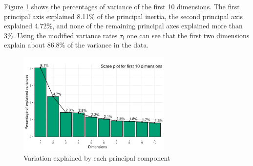 \documentclass[conference,final,]{IEEEtran}
\begin{document}
Figure \ref{fig:screeplot} shows the percentages of variance of the
first 10 dimensions. The first principal axis explained 8.11\% of the
principal inertia, the second principal axis explained 4.72\%, and none
of the remaining principal axes explained more than 3\%. Using the
modified variance rates \(\tau_l\) one can see that the first two
dimensions explain about 86.8\% of the variance in the data.

\begin{figure}[!ht] 
\centering 
\includegraphics[width=3in]{../figs/screeplot.pdf}
\caption{Variation explained by each principal component}
\label{fig:screeplot} 
\end{figure}
\end{document}
